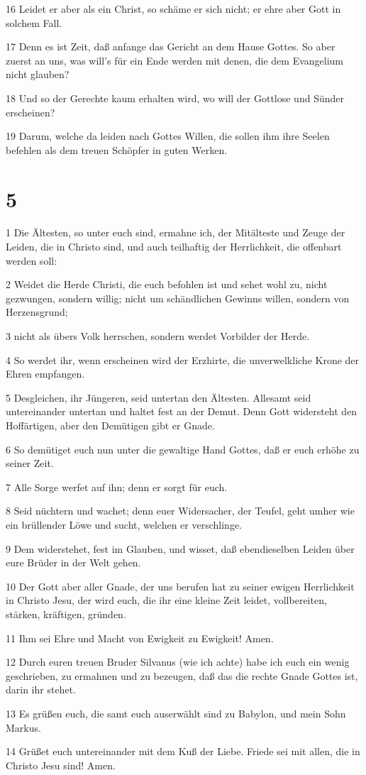 \par 16 Leidet er aber als ein Christ, so schäme er sich nicht; er ehre aber Gott in solchem Fall.
\par 17 Denn es ist Zeit, daß anfange das Gericht an dem Hause Gottes. So aber zuerst an uns, was will's für ein Ende werden mit denen, die dem Evangelium nicht glauben?
\par 18 Und so der Gerechte kaum erhalten wird, wo will der Gottlose und Sünder erscheinen?
\par 19 Darum, welche da leiden nach Gottes Willen, die sollen ihm ihre Seelen befehlen als dem treuen Schöpfer in guten Werken.

\chapter{5}

\par 1 Die Ältesten, so unter euch sind, ermahne ich, der Mitälteste und Zeuge der Leiden, die in Christo sind, und auch teilhaftig der Herrlichkeit, die offenbart werden soll:
\par 2 Weidet die Herde Christi, die euch befohlen ist und sehet wohl zu, nicht gezwungen, sondern willig; nicht um schändlichen Gewinns willen, sondern von Herzensgrund;
\par 3 nicht als übers Volk herrschen, sondern werdet Vorbilder der Herde.
\par 4 So werdet ihr, wenn erscheinen wird der Erzhirte, die unverwelkliche Krone der Ehren empfangen.
\par 5 Desgleichen, ihr Jüngeren, seid untertan den Ältesten. Allesamt seid untereinander untertan und haltet fest an der Demut. Denn Gott widersteht den Hoffärtigen, aber den Demütigen gibt er Gnade.
\par 6 So demütiget euch nun unter die gewaltige Hand Gottes, daß er euch erhöhe zu seiner Zeit.
\par 7 Alle Sorge werfet auf ihn; denn er sorgt für euch.
\par 8 Seid nüchtern und wachet; denn euer Widersacher, der Teufel, geht umher wie ein brüllender Löwe und sucht, welchen er verschlinge.
\par 9 Dem widerstehet, fest im Glauben, und wisset, daß ebendieselben Leiden über eure Brüder in der Welt gehen.
\par 10 Der Gott aber aller Gnade, der uns berufen hat zu seiner ewigen Herrlichkeit in Christo Jesu, der wird euch, die ihr eine kleine Zeit leidet, vollbereiten, stärken, kräftigen, gründen.
\par 11 Ihm sei Ehre und Macht von Ewigkeit zu Ewigkeit! Amen.
\par 12 Durch euren treuen Bruder Silvanus (wie ich achte) habe ich euch ein wenig geschrieben, zu ermahnen und zu bezeugen, daß das die rechte Gnade Gottes ist, darin ihr stehet.
\par 13 Es grüßen euch, die samt euch auserwählt sind zu Babylon, und mein Sohn Markus.
\par 14 Grüßet euch untereinander mit dem Kuß der Liebe. Friede sei mit allen, die in Christo Jesu sind! Amen.

